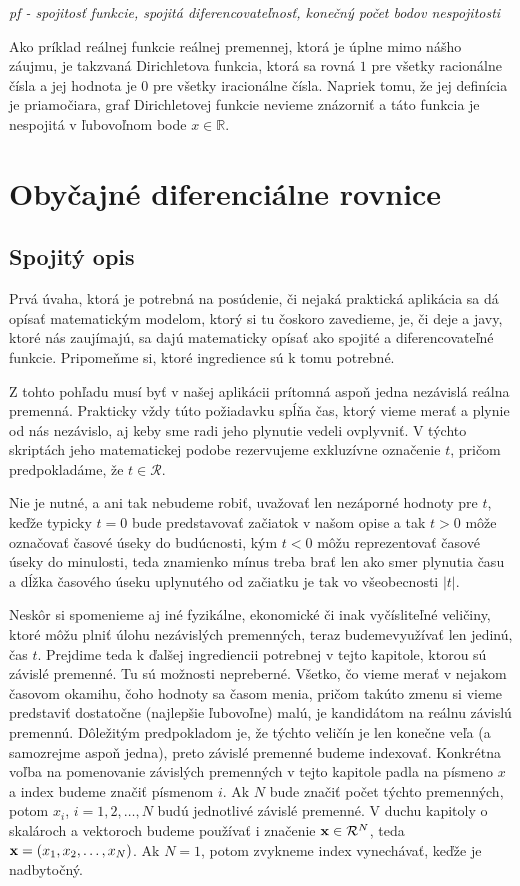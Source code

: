 {\it pf - spojitosť funkcie, spojitá diferencovateľnosť, konečný počet bodov nespojitosti}

Ako príklad reálnej funkcie reálnej premennej, ktorá je úplne mimo nášho záujmu, je takzvaná Dirichletova funkcia, ktorá sa rovná $1$ pre všetky racionálne čísla a jej hodnota je $0$ pre všetky iracionálne čísla. Napriek tomu, že jej definícia je priamočiara, graf Dirichletovej funkcie nevieme znázorniť a táto funkcia je nespojitá v ľubovoľnom bode $x \in \mathbb{R}$. 


\chapter{Obyčajné diferenciálne rovnice}

\section{Spojitý opis}

Prvá úvaha, ktorá je potrebná na posúdenie, či nejaká praktická aplikácia sa dá opísať matematickým modelom, ktorý si tu čoskoro zavedieme, je, či deje a javy, ktoré nás zaujímajú, sa dajú matematicky opísať ako spojité a diferencovateľné funkcie. Pripomeňme si, ktoré ingredience sú k tomu potrebné.

Z tohto pohľadu musí byť v našej aplikácii prítomná aspoň jedna nezávislá reálna premenná. Prakticky vždy túto požiadavku spĺňa čas, ktorý vieme merať a plynie od nás nezávislo, aj keby sme radi jeho plynutie vedeli ovplyvniť. V týchto skriptách jeho matematickej podobe rezervujeme exkluzívne označenie $t$, pričom predpokladáme, že $t \in \mathcal{R}$. 

Nie je nutné, a ani tak nebudeme robiť, uvažovať len nezáporné hodnoty pre $t$, keďže typicky $t=0$ bude predstavovať začiatok v našom opise a tak $t>0$ môže označovať časové úseky do budúcnosti, kým $t<0$  môžu reprezentovať časové úseky do minulosti, teda znamienko mínus treba brať len ako smer plynutia času a dĺžka časového úseku uplynutého od začiatku je tak vo všeobecnosti $|t|$.

Neskôr si spomenieme aj iné fyzikálne, ekonomické či inak vyčísliteľné veličiny, ktoré môžu plniť úlohu nezávislých premenných, teraz budemevyužívať len jedinú, čas $t$. Prejdime teda k ďalšej ingrediencii potrebnej v tejto kapitole, ktorou sú závislé premenné. Tu sú možnosti nepreberné. Všetko, čo vieme  merať v nejakom časovom okamihu, čoho hodnoty sa časom menia, pričom takúto zmenu si vieme predstaviť dostatočne (najlepšie ľubovoľne) malú, je kandidátom na reálnu závislú premennú. Dôležitým predpokladom je, že týchto veličín je len konečne veľa (a samozrejme aspoň jedna), preto závislé premenné budeme indexovať. Konkrétna voľba na pomenovanie závislých premenných v tejto kapitole padla na písmeno $x$ a index budeme značiť písmenom $i$. Ak $N$ bude značiť počet týchto premenných, potom $x_i$, $i=1,2,\ldots,N$ budú jednotlivé závislé premenné. V duchu kapitoly o skalároch a vektoroch budeme používať i značenie ${\bf x} \in \mathcal{R}^N$, teda ${\bf x}=(x_1,x_2,\ldots,x_N)$. Ak $N=1$, potom zvykneme index vynechávať, keďže je nadbytočný.

